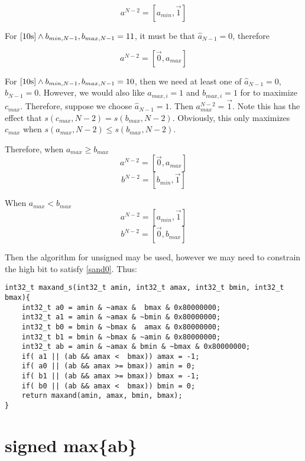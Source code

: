 \documentclass{article}
\begin{document}
\begin{equation*}
a^{N-2} = [a_{min}, \vec 1]
\end{equation*}

For $\eqref{10s} \wedge b_{min,N-1},b_{max,N-1} = 11$, it must be that $\hat a_{N-1} = 0$,
therefore

\begin{equation*}
a^{N-2} = [\vec 0, a_{max}]
\end{equation*}

For $\eqref{10s} \wedge b_{min,N-1},b_{max,N-1} = 10$, then we need at least
one of $\hat a_{N-1} = 0$, $\hat b_{N-1} = 0$. However, we would also like
$a_{max,i} = 1$ and $b_{max,i} = 1$ for to maximize $c_{max}$. 
Therefore, suppose we choose $\hat a_{N-1} = 1$. Then $a^{N-2}_{max} = \vec 1$.
Note this has the effect that $s(c_{max},N-2) = s(b_{max},N-2)$. 
Obviously, this only maximizes $c_{max}$ when $s(a_{max},N-2) \le 
s(b_{max},N-2)$.

Therefore, when $a_{max} \ge b_{max}$
\begin{equation*}
a^{N-2} = [\vec 0, a_{max}]
\end{equation*}
\begin{equation*}
b^{N-2} = [b_{min}, \vec 1]
\end{equation*}

When $a_{max} < b_{max}$
\begin{equation*}
a^{N-2} = [a_{min}, \vec 1]
\end{equation*}
\begin{equation*}
b^{N-2} = [\vec 0, b_{max}]
\end{equation*}

Then the algorithm for unsigned may be used, however we may need to constrain
the high bit to satisfy \eqref{sand0}. Thus: 
\begin{lstlisting}
int32_t maxand_s(int32_t amin, int32_t amax, int32_t bmin, int32_t bmax){
    int32_t a0 = amin & ~amax &  bmax & 0x80000000;
    int32_t a1 = amin & ~amax & ~bmin & 0x80000000;
    int32_t b0 = bmin & ~bmax &  amax & 0x80000000;
    int32_t b1 = bmin & ~bmax & ~amin & 0x80000000;
    int32_t ab = amin & ~amax & bmin & ~bmax & 0x80000000;
    if( a1 || (ab && amax <  bmax)) amax = -1;
    if( a0 || (ab && amax >= bmax)) amin = 0;
    if( b1 || (ab && amax >= bmax)) bmax = -1;
    if( b0 || (ab && amax <  bmax)) bmin = 0;
    return maxand(amin, amax, bmin, bmax);
}
\end{lstlisting}

\section{signed max\{a\text{\textbar}b\}}
\end{document}
